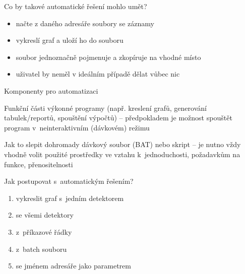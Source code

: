 \documentclass{beamer}
\begin{document}
\begin{frame}{Co by takové automatické řešení mohlo umět?}
  \begin{itemize}
    \item načte z daného adresáře soubory se záznamy
    \item vykreslí graf a uloží ho do souboru
    \item soubor jednoznačně pojmenuje a zkopíruje na vhodné místo
    \item uživatel by neměl v ideálním případě dělat vůbec nic
  \end{itemize}
\end{frame}

\begin{frame}{Komponenty pro automatizaci}
  \begin{block}{Funkční části}
    výkonné programy (např. kreslení grafů, generování tabulek/reportů, spouštění výpočtů) -- předpokladem je možnost spouštět program v~neinteraktivním (dávkovém) režimu
  \end{block}
  \pause
  \begin{block}{Jak to slepit dohromady}
    dávkový soubor (BAT) nebo skript -- je nutno vždy vhodně volit použité prostředky ve vztahu k~jednoduchosti, požadavkům na funkce, přenositelnosti
  \end{block}
\end{frame}

\begin{frame}{Jak postupovat s~automatickým řešením?}
  \begin{enumerate}
    \item vykreslit graf s~jedním detektorem
    \pause
    \item se všemi detektory
    \pause
    \item z~příkazové řádky
    \pause
    \item z~batch souboru
    \pause
    \item se jménem adresáře jako parametrem
  \end{enumerate}
\end{frame}
\end{document}
